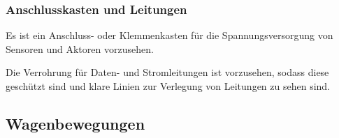 \subsubsection{Anschlusskasten und Leitungen}
\begin{feat}
Es ist ein Anschluss- oder Klemmenkasten für die Spannungsversorgung von Sensoren und Aktoren vorzusehen. 
\end{feat}
\begin{feat}
Die Verrohrung für Daten- und Stromleitungen ist vorzusehen, sodass diese geschützt sind und klare Linien zur Verlegung von Leitungen zu sehen sind.
\end{feat}

\subsection{Wagenbewegungen}
\begin{comment}
Es gibt verschiedene Wagenbewegungen. Diese Bewegungen können sein:
\begin{itemize}
    \item Rangieren mittels Lok und mit Luftkupplung
    \item Rangieren mittels Lok und ohne Luftkupplung
    \item Verschieben mittels Rangierhilfsmittel ohne Luftkupplung
    \item Zugfahrten
    \item Rangierfahrten
    \item Sperrfahrten
    \item Bedienfahrten
\end{itemize}
\begin{feat}
Für jede Art von Wagenbewegungen sind Betriebsparameter notwendig.
\end{feat}
\begin{rem} [zu Anf. 15]
Wagenbewegungen können sein:
\begin{itemize}
    \item Bedienfahrten
    \item Rangierfahrten
    \item Sperrfahrten
    \item Zugfahrten
    \item Verschub
\end{itemize}
\end{rem}
\end{comment}



